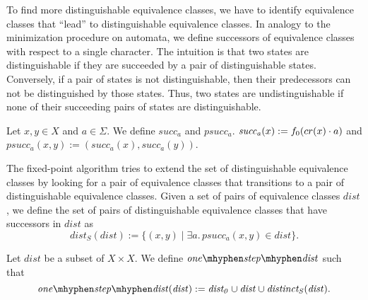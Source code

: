 

To find more distinguishable equivalence classes, we have to identify equivalence classes that ``lead'' to distinguishable equivalence classes. 
In analogy to the minimization procedure on automata, we define successors of equivalence classes with respect to a single character.
The intuition is that two states are distinguishable if they are succeeded by a pair of distinguishable states.
Conversely, if a pair of states is not distinguishable, then their predecessors can not be distinguished by those states.
Thus, two states are undistinguishable if none of their succeeding pairs of states are distinguishable.


\begin{definition}
    Let $x,y \in X$ and $a \in \Sigma$.
    We define $\mathit{succ_a}$ and $\mathit{psucc_a}$. $\mathit{succ_a}(x) := {f_0}(cr(x)\cdot a)$ and $\mathit{psucc_a}(x,y) := (\mathit{succ_a}(x), \mathit{succ_a}(y))$.
\end{definition}

The fixed-point algorithm tries to extend the set of distinguishable equivalence classes by looking for a pair of equivalence classes that transitions to a pair of distinguishable equivalence classes. 
Given a set of pairs of equivalence classes $\mathit{dist}$, 
we define the set of pairs of distinguishable equivalence classes that have successors in $\mathit{dist}$ as
\begin{equation*}
    \mathit{dist_S}(\mathit{dist}) := \{ (x,y) \; | \; \exists a. \, \mathit{psucc_a}(x,y) \in \mathit{dist}\}.
\end{equation*}

\begin{definition}
    \label{one_step_dist}
    Let $\mathit{dist}$ be a subset of $X \times X$. We define $\mathit{one\mhyphen step\mhyphen dist}$ such that
    \begin{equation*}
        \mathit{one\mhyphen step\mhyphen dist}(\mathit{dist}) := \mathit{dist_0} \cup \mathit{dist} \cup \mathit{distinct_S}(\mathit{dist}).
    \end{equation*}
\end{definition}



